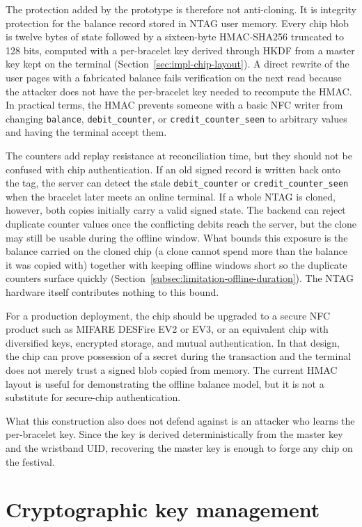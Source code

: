 The protection added by the prototype is therefore not anti-cloning. It is integrity protection for the balance record stored in NTAG user memory. Every chip blob is twelve bytes of state followed by a sixteen-byte HMAC-SHA256 truncated to 128 bits, computed with a per-bracelet key derived through HKDF from a master key kept on the terminal (Section~\ref{sec:impl-chip-layout}). A direct rewrite of the user pages with a fabricated balance fails verification on the next read because the attacker does not have the per-bracelet key needed to recompute the HMAC. In practical terms, the HMAC prevents someone with a basic NFC writer from changing \texttt{balance}, \texttt{debit\_counter}, or \texttt{credit\_counter\_seen} to arbitrary values and having the terminal accept them.

The counters add replay resistance at reconciliation time, but they should not be confused with chip authentication. If an old signed record is written back onto the tag, the server can detect the stale \texttt{debit\_counter} or \texttt{credit\_counter\_seen} when the bracelet later meets an online terminal. If a whole NTAG is cloned, however, both copies initially carry a valid signed state. The backend can reject duplicate counter values once the conflicting debits reach the server, but the clone may still be usable during the offline window. What bounds this exposure is the balance carried on the cloned chip (a clone cannot spend more than the balance it was copied with) together with keeping offline windows short so the duplicate counters surface quickly (Section~\ref{subsec:limitation-offline-duration}). The NTAG hardware itself contributes nothing to this bound.

For a production deployment, the chip should be upgraded to a secure NFC product such as MIFARE DESFire EV2 or EV3, or an equivalent chip with diversified keys, encrypted storage, and mutual authentication. In that design, the chip can prove possession of a secret during the transaction and the terminal does not merely trust a signed blob copied from memory. The current HMAC layout is useful for demonstrating the offline balance model, but it is not a substitute for secure-chip authentication.

What this construction also does not defend against is an attacker who learns the per-bracelet key. Since the key is derived deterministically from the master key and the wristband UID, recovering the master key is enough to forge any chip on the festival.

\section{Cryptographic key management}
\label{sec:key-management}

